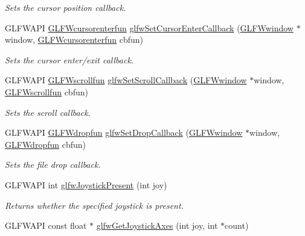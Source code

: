 \begin{DoxyCompactItemize}
\begin{DoxyCompactList}\small\item\em Sets the cursor position callback. \end{DoxyCompactList}\item 
G\+L\+F\+W\+A\+PI \hyperlink{group__input_ga51ab436c41eeaed6db5a0c9403b1c840}{G\+L\+F\+Wcursorenterfun} \hyperlink{group__input_gaa20014985561efeb2c53f1956f727830}{glfw\+Set\+Cursor\+Enter\+Callback} (\hyperlink{group__window_ga3c96d80d363e67d13a41b5d1821f3242}{G\+L\+F\+Wwindow} $\ast$window, \hyperlink{group__input_ga51ab436c41eeaed6db5a0c9403b1c840}{G\+L\+F\+Wcursorenterfun} cbfun)
\begin{DoxyCompactList}\small\item\em Sets the cursor enter/exit callback. \end{DoxyCompactList}\item 
G\+L\+F\+W\+A\+PI \hyperlink{group__input_ga4687e2199c60a18a8dd1da532e6d75c9}{G\+L\+F\+Wscrollfun} \hyperlink{group__input_ga29011514e93368712a3063a28707ced3}{glfw\+Set\+Scroll\+Callback} (\hyperlink{group__window_ga3c96d80d363e67d13a41b5d1821f3242}{G\+L\+F\+Wwindow} $\ast$window, \hyperlink{group__input_ga4687e2199c60a18a8dd1da532e6d75c9}{G\+L\+F\+Wscrollfun} cbfun)
\begin{DoxyCompactList}\small\item\em Sets the scroll callback. \end{DoxyCompactList}\item 
G\+L\+F\+W\+A\+PI \hyperlink{group__input_gab71f4ca80b651462852e601caf308c4a}{G\+L\+F\+Wdropfun} \hyperlink{group__input_gad4fc40df63a5d0441ab06de9a585cc04}{glfw\+Set\+Drop\+Callback} (\hyperlink{group__window_ga3c96d80d363e67d13a41b5d1821f3242}{G\+L\+F\+Wwindow} $\ast$window, \hyperlink{group__input_gab71f4ca80b651462852e601caf308c4a}{G\+L\+F\+Wdropfun} cbfun)
\begin{DoxyCompactList}\small\item\em Sets the file drop callback. \end{DoxyCompactList}\item 
G\+L\+F\+W\+A\+PI int \hyperlink{group__input_ga7f81f22f355f4b7d315caf73cdfd9906}{glfw\+Joystick\+Present} (int joy)
\begin{DoxyCompactList}\small\item\em Returns whether the specified joystick is present. \end{DoxyCompactList}\item 
G\+L\+F\+W\+A\+PI const float $\ast$ \hyperlink{group__input_gaaab55af25a46327a58052abac82b959f}{glfw\+Get\+Joystick\+Axes} (int joy, int $\ast$count)

\end{DoxyCompactItemize}
